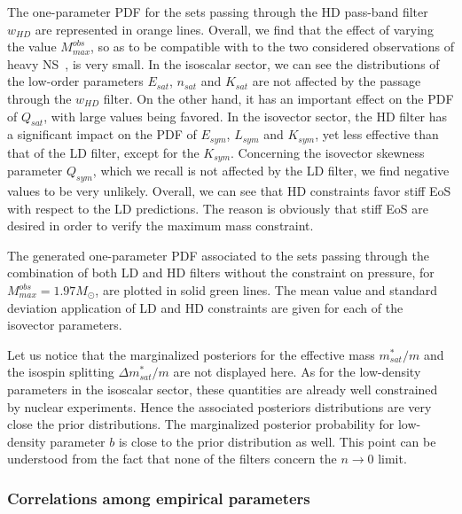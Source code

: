 The one-parameter PDF for the sets passing through the HD pass-band filter 
$w_{HD}$ are represented in orange lines. Overall, we find that the effect of
varying the value $M_{max}^{obs}$, so as to be compatible with to the two 
considered observations of heavy NS~\cite{Antoniadis2013,Cromartie2020}, is 
very small. In the isoscalar sector, we can see the distributions of the 
low-order parameters $E_{sat}$, $n_{sat}$ and $K_{sat}$ are not affected 
by the passage through the $w_{HD}$ filter. On the other hand, it has an
important effect on the PDF of $Q_{sat}$, with large values being favored. In
the isovector sector, the HD filter has a significant impact on the PDF of
$E_{sym}$, $L_{sym}$ and $K_{sym}$, yet less effective than that of the LD 
filter, except for the $K_{sym}$. Concerning the isovector skewness parameter
$Q_{sym}$, which we recall is not affected by the LD filter, we find negative 
values to be very unlikely. 
Overall, we can see that HD constraints favor stiff EoS with respect to the LD 
predictions. The reason is obviously that stiff EoS are desired in order to 
verify the maximum mass constraint.

The generated one-parameter PDF associated to the sets passing through the 
combination of both LD and HD filters without the constraint on pressure, 
for $M_{max}^{obs}=1.97M_\odot$, are plotted in solid green lines. The
mean value and standard deviation application of LD and HD constraints are 
given for each of the isovector parameters.

Let us notice that the marginalized posteriors for the effective mass 
$m_{sat}^*/m$ and the isospin splitting $\Delta m_{sat}^*/m$ are not displayed 
here. As for the low-density parameters in the isoscalar sector, these 
quantities are already well constrained by nuclear experiments. Hence the
associated posteriors distributions are very close the prior distributions. The
marginalized posterior probability for low-density parameter $b$ is close to
the prior distribution as well. This point can be understood from the fact that 
none of the filters concern the $n \rightarrow 0$ limit.

\subsubsection{Correlations among empirical parameters}\label{subsubsec:corr}

